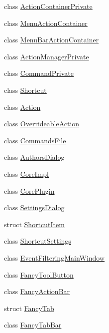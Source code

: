 \begin{DoxyCompactItemize}
\item 
class \hyperlink{class_core_1_1_internal_1_1_action_container_private}{Action\-Container\-Private}
\item 
class \hyperlink{class_core_1_1_internal_1_1_menu_action_container}{Menu\-Action\-Container}
\item 
class \hyperlink{class_core_1_1_internal_1_1_menu_bar_action_container}{Menu\-Bar\-Action\-Container}
\item 
class \hyperlink{class_core_1_1_internal_1_1_action_manager_private}{Action\-Manager\-Private}
\item 
class \hyperlink{class_core_1_1_internal_1_1_command_private}{Command\-Private}
\item 
class \hyperlink{class_core_1_1_internal_1_1_shortcut}{Shortcut}
\item 
class \hyperlink{class_core_1_1_internal_1_1_action}{Action}
\item 
class \hyperlink{class_core_1_1_internal_1_1_overrideable_action}{Overrideable\-Action}
\item 
class \hyperlink{class_core_1_1_internal_1_1_commands_file}{Commands\-File}
\item 
class \hyperlink{class_core_1_1_internal_1_1_authors_dialog}{Authors\-Dialog}
\item 
class \hyperlink{class_core_1_1_internal_1_1_core_impl}{Core\-Impl}
\item 
class \hyperlink{class_core_1_1_internal_1_1_core_plugin}{Core\-Plugin}
\item 
class \hyperlink{class_core_1_1_internal_1_1_settings_dialog}{Settings\-Dialog}
\item 
struct \hyperlink{struct_core_1_1_internal_1_1_shortcut_item}{Shortcut\-Item}
\item 
class \hyperlink{class_core_1_1_internal_1_1_shortcut_settings}{Shortcut\-Settings}
\item 
class \hyperlink{class_core_1_1_internal_1_1_event_filtering_main_window}{Event\-Filtering\-Main\-Window}
\item 
class \hyperlink{class_core_1_1_internal_1_1_fancy_tool_button}{Fancy\-Tool\-Button}
\item 
class \hyperlink{class_core_1_1_internal_1_1_fancy_action_bar}{Fancy\-Action\-Bar}
\item 
struct \hyperlink{struct_core_1_1_internal_1_1_fancy_tab}{Fancy\-Tab}
\item 
class \hyperlink{class_core_1_1_internal_1_1_fancy_tab_bar}{Fancy\-Tab\-Bar}

\end{DoxyCompactItemize}
